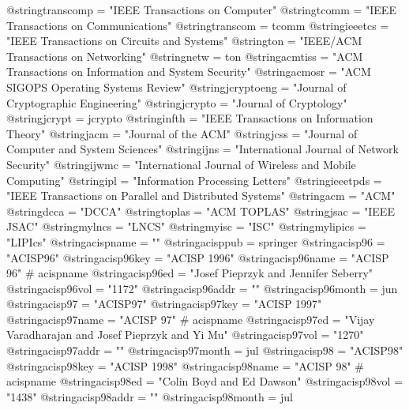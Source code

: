 @string{transcomp =             "{IEEE} Transactions on Computer"}
@string{tcomm =                 "{IEEE} Transactions on Communications"}
@string{transcom =              tcomm}
@string{ieeetcs =               "{IEEE} Transactions on Circuits and Systems"}
@string{ton =                   "{IEEE/ACM} Transactions on Networking"}
@string{netw =                  ton}
@string{acmtiss =               "{ACM} Transactions on Information and System Security"}
@string{acmosr =                "{ACM SIGOPS} Operating Systems Review"}
@string{jcryptoeng =            "Journal of Cryptographic Engineering"}
@string{jcrypto =               "Journal of Cryptology"}
@string{jcrypt =                jcrypto}
@string{infth =                 "{IEEE} Transactions on Information Theory"}
@string{jacm =                  "Journal of the {ACM}"}
@string{jcss =                  "Journal of Computer and System Sciences"}
@string{ijns =                  "International Journal of Network Security"}
@string{ijwmc =                 "International Journal of Wireless and Mobile Computing"}
@string{ipl =                   "Information Processing Letters"}
@string{ieeetpds =              "{IEEE} Transactions on Parallel and Distributed Systems"}
@string{acm =                   "{ACM}"}
@string{dcca =                  "{DCCA}"}
@string{toplas =                "{ACM} {TOPLAS}"}
@string{jsac =                  "{IEEE} {JSAC}"}
@string{mylncs =                "{LNCS}"}
@string{myisc =                 "{ISC}"}
@string{mylipics =              "{LIPIcs}"}
@string{acispname =             ""}
@string{acisppub =              springer}
@string{acisp96 =               "ACISP96"}
@string{acisp96key =            "ACISP 1996"}
@string{acisp96name =           "ACISP 96" # acispname}
@string{acisp96ed =             "Josef Pieprzyk and Jennifer Seberry"}
@string{acisp96vol =            "1172"}
@string{acisp96addr =           ""}
@string{acisp96month =          jun}
@string{acisp97 =               "ACISP97"}
@string{acisp97key =            "ACISP 1997"}
@string{acisp97name =           "ACISP 97" # acispname}
@string{acisp97ed =             "Vijay Varadharajan and Josef Pieprzyk and Yi Mu"}
@string{acisp97vol =            "1270"}
@string{acisp97addr =           ""}
@string{acisp97month =          jul}
@string{acisp98 =               "ACISP98"}
@string{acisp98key =            "ACISP 1998"}
@string{acisp98name =           "ACISP 98" # acispname}
@string{acisp98ed =             "Colin Boyd and Ed Dawson"}
@string{acisp98vol =            "1438"}
@string{acisp98addr =           ""}
@string{acisp98month =          jul}

